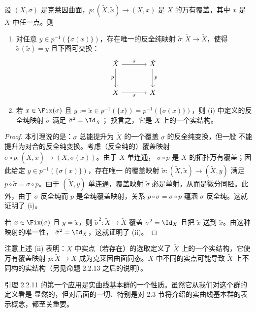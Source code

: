 \begin{lemma}\label{lem:2.2.11}
设 $(X,\sigma)$ 是克莱因曲面，$p:(\tilde X,\tilde x)\to(X,x)$ 是 $X$ 的万有覆盖，其中
$x$ 是 $X$ 中任一点。则
\begin{enumerate}[label=(\roman*), leftmargin=2.2em, itemsep=0.15em]
\item 对任意 $y\in p^{-1}(\{\sigma(x)\})$，存在唯一的反全纯映射
      $\tilde\sigma:\tilde X\to\tilde X$，使得 $\tilde\sigma(\tilde x)=y$
      且下图可交换：
\[
\begin{tikzcd}[column sep=large, row sep=large]
\tilde X \arrow[r, "\tilde\sigma"] \arrow[d, "p"'] & \tilde X \arrow[d, "p"]\\
X \arrow[r, "\sigma"'] & X
\end{tikzcd}
\]
\item 若 $x\in\Fix(\sigma)$ 且 $y:=\tilde x\in p^{-1}(\{x\})=p^{-1}(\{\sigma(x)\})$，则
      (i) 中定义的反全纯映射 $\tilde\sigma$ 满足 $\tilde\sigma^2=\Id_{\tilde X}$；
      换言之，它是 $\tilde X$ 上的一个实结构。
\end{enumerate}
\end{lemma}

\begin{proof}
本引理说的是：$\sigma$ 总能提升为 $\tilde X$ 的一个覆盖 $\sigma$ 的反全纯变换，但一般
不能提升为对合的反全纯变换。考虑（反全纯的）覆盖映射
$\sigma\circ p:(\tilde X,\tilde x)\to(X,\sigma(x))$。由于 $\tilde X$ 单连通，
$\sigma\circ p$ 是 $X$ 的拓扑万有覆盖；因此给定 $y\in p^{-1}(\{\sigma(x)\})$，存在唯一
的覆盖映射 $\tilde\sigma:(\tilde X,\tilde x)\to(\tilde X,y)$ 满足
$p\circ\tilde\sigma=\sigma\circ p$。由于 $(\tilde X,y)$ 单连通，覆盖映射 $\tilde\sigma$
必是单射，从而是微分同胚。此外，由于 $\sigma$ 反全纯而 $p$ 是全纯覆盖映射，关系
$p\circ\tilde\sigma=\sigma\circ p$ 蕴涵 $\tilde\sigma$ 反全纯。这就证明了 (i)。

若 $x\in\Fix(\sigma)$ 且 $y=\tilde x$，则 $\tilde\sigma^2:\tilde X\to\tilde X$ 覆盖
$\sigma^2=\Id_X$ 且把 $\tilde x$ 送到 $\tilde x$。由这种映射的唯一性，
$\tilde\sigma^2=\Id_{\tilde X}$，这就证明了 (ii)。
\end{proof}

注意上述 (ii) 表明：$X$ 中实点（若存在）的选取定义了 $\tilde X$ 上的一个实结构，它使
万有覆盖映射 $p:\tilde X\to X$ 成为克莱因曲面同态。$X$ 中不同的实点可能导致 $\tilde X$
上不同构的实结构（另见命题 2.2.13 之后的说明）。

引理 2.2.11 的第一个应用是实曲线基本群的一个性质。虽然它从我们对这个群的定义看是
显然的，但对后面的一切、特别是对 2.3 节将介绍的实曲线基本群的表示概念，都至关重要。

